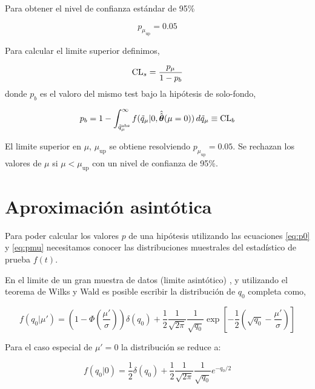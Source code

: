 Para obtener el nivel de confianza estándar de 95\%

\begin{equation}
  p_{\mu_\text{up}} = 0.05
\end{equation}

Para calcular el limite superior {\cls} definimos,

\begin{equation}
  \text{CL}_s = \frac{p_\mu}{1-p_b}
\end{equation}
%
donde $p_b$ es el valoro del mismo test bajo la hipótesis de solo-fondo,

\begin{equation}
  p_b = 1 - \int_{\tilde{q}_\mu^\text{obs}}^{\infty}
  f(\tilde{q}_\mu|0,\hat{\hat{\bm{\theta}}}(\mu=0)) \, d\tilde{q}_\mu \equiv \text{CL}_b
\end{equation}


El limite superior {\cls} en $\mu$, $\mu_\text{up}$ se obtiene resolviendo
$p_{\mu_\text{up}} = 0.05$. Se rechazan los valores de $\mu$ si $\mu <
\mu_\text{up}$ con un nivel de confianza de 95\%.


\section{Aproximación asintótica}

Para poder calcular los valores $p$ de una hipótesis utilizando las ecuaciones
\eqref{eq:p0} y \eqref{eq:pmu} necesitamos conocer las distribuciones muestrales
del estadístico de prueba $f(t)$.

En el limite de un gran muestra de datos (limite asintótico) \cite{AsymAprox}, y
utilizando el teorema de Wilks\cite{WilksTheo} y Wald\cite{WaldTheo} es posible
escribir la distribución de $q_0$ completa como,

\begin{equation}
  f(q_0|\mu') = \left( 1 - \Phi\left(\frac{\mu'}{\sigma}\right)\right)
  \delta(q_0) + \frac{1}{2}\frac{1}{\sqrt{2\pi}}\frac{1}{\sqrt{q_0}} \exp \left[
    -\frac{1}{2} \left( \sqrt{q_0} - \frac{\mu'}{\sigma} \right)\right]
\end{equation}

Para el caso especial de $\mu' = 0$ la distribución se reduce a:

\begin{equation}
  f(q_0|0) = \frac{1}{2} \delta(q_0) +
  \frac{1}{2}\frac{1}{\sqrt{2\pi}}\frac{1}{\sqrt{q_0}} e^{-q_0/2}
\end{equation}

